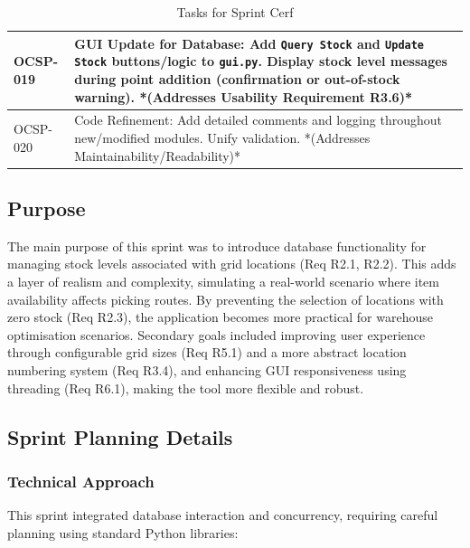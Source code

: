 \begin{table}[htbp]
\begin{tabularx}{\textwidth}{|l|X|}
		\hline
		OCSP-019 & GUI Update for Database: Add \verb|Query Stock| and \verb|Update Stock| buttons/logic to \verb|gui.py|. Display stock level messages during point addition (confirmation or out-of-stock warning). *(Addresses Usability Requirement R3.6)* \\
		\hline
		OCSP-020 & Code Refinement: Add detailed comments and logging throughout new/modified modules. Unify validation. *(Addresses Maintainability/Readability)* \\
		\hline
	\end{tabularx}
	\caption{Tasks for Sprint Cerf}
\end{table}

\subsection{Purpose}

The main purpose of this sprint was to introduce database functionality for managing stock levels associated with grid locations (Req R2.1, R2.2). This adds a layer of realism and complexity, simulating a real-world scenario where item availability affects picking routes. By preventing the selection of locations with zero stock (Req R2.3), the application becomes more practical for warehouse optimisation scenarios. Secondary goals included improving user experience through configurable grid sizes (Req R5.1) and a more abstract location numbering system (Req R3.4), and enhancing GUI responsiveness using threading (Req R6.1), making the tool more flexible and robust.

\clearpage
\subsection{Sprint Planning Details}

\subsubsection{Technical Approach}

This sprint integrated database interaction and concurrency, requiring careful planning using standard Python libraries:

